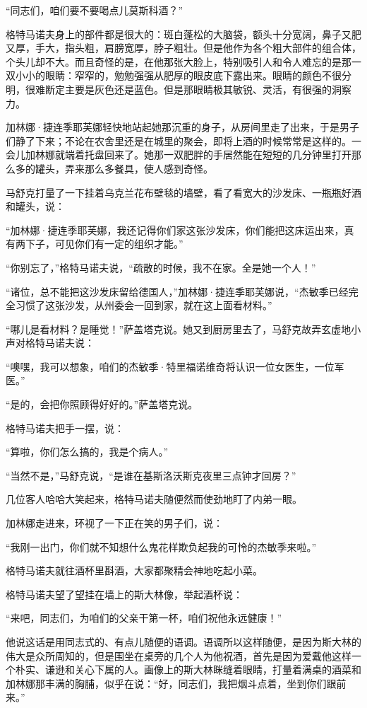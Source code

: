 “同志们，咱们要不要喝点儿莫斯科酒？”

格特马诺夫身上的部件都是很大的：斑白蓬松的大脑袋，额头十分宽阔，鼻子又肥又厚，手大，指头粗，肩膀宽厚，脖子粗壮。但是他作为各个粗大部件的组合体，个头儿却不大。而且奇怪的是，在他那张大脸上，特别吸引人和令人难忘的是那一双小小的眼睛：窄窄的，勉勉强强从肥厚的眼皮底下露出来。眼睛的颜色不很分明，很难断定主要是灰色还是蓝色。但是那眼睛极其敏锐、灵活，有很强的洞察力。

加林娜·捷连季耶芙娜轻快地站起她那沉重的身子，从房间里走了出来，于是男子们静了下来；不论在农舍里还是在城里的聚会，即将上酒的时候常常是这样的。一会儿加林娜就端着托盘回来了。她那一双肥胖的手居然能在短短的几分钟里打开那么多的罐头，弄来那么多餐具，使人感到奇怪。

马舒克打量了一下挂着乌克兰花布壁毯的墙壁，看了看宽大的沙发床、一瓶瓶好酒和罐头，说：

“加林娜·捷连季耶芙娜，我还记得你们家这张沙发床，你们能把这床运出来，真有两下子，可见你们有一定的组织才能。”

“你别忘了，”格特马诺夫说，“疏散的时候，我不在家。全是她一个人！”

“诸位，总不能把这沙发床留给德国人，”加林娜·捷连季耶芙娜说，“杰敏季已经完全习惯了这张沙发，从州委会一回到家，就在这上面看材料。”

“哪儿是看材料？是睡觉！”萨盖塔克说。她又到厨房里去了，马舒克故弄玄虚地小声对格特马诺夫说：

“噢嘿，我可以想象，咱们的杰敏季·特里福诺维奇将认识一位女医生，一位军医。”

“是的，会把你照顾得好好的。”萨盖塔克说。

格特马诺夫把手一摆，说：

“算啦，你们怎么搞的，我是个病人。”

“当然不是，”马舒克说，“是谁在基斯洛沃斯克夜里三点钟才回房？”

几位客人哈哈大笑起来，格特马诺夫随便然而使劲地盯了内弟一眼。

加林娜走进来，环视了一下正在笑的男子们，说：

“我刚一出门，你们就不知想什么鬼花样欺负起我的可怜的杰敏季来啦。”

格特马诺夫就往酒杯里斟酒，大家都聚精会神地吃起小菜。

格特马诺夫望了望挂在墙上的斯大林像，举起酒杯说：

“来吧，同志们，为咱们的父亲干第一杯，咱们祝他永远健康！”

他说这话是用同志式的、有点儿随便的语调。语调所以这样随便，是因为斯大林的伟大是众所周知的，但是围坐在桌旁的几个人为他祝酒，首先是因为爱戴他这样一个朴实、谦逊和关心下属的人。画像上的斯大林眯缝着眼睛，打量着满桌的酒菜和加林娜那丰满的胸脯，似乎在说：“好，同志们，我把烟斗点着，坐到你们跟前来。”

